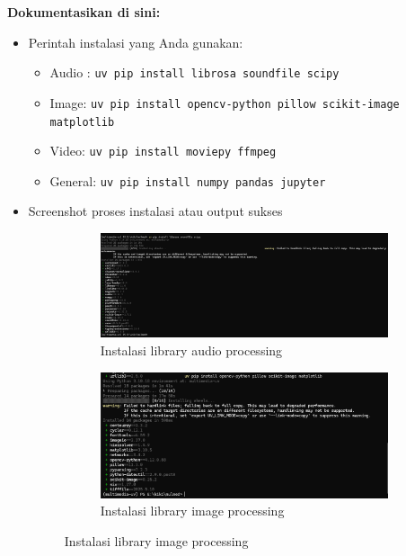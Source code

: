 \documentclass[11pt,a4paper]{article}
\begin{document}
\textbf{Dokumentasikan di sini:}
\begin{itemize}
    \item Perintah instalasi yang Anda gunakan:
        \begin{itemize}
            \item Audio : \texttt{uv pip install librosa soundfile scipy}
            \item Image: \texttt{uv pip install opencv-python pillow scikit-image matplotlib}
            \item Video: \texttt{uv pip install moviepy ffmpeg}
            \item General: \texttt{uv pip install numpy pandas jupyter}
        \end{itemize}
    \item Screenshot proses instalasi atau output sukses
        \begin{figure}[h]
            \centering
            \begin{subfigure}{0.48\textwidth}
                \includegraphics[width=\linewidth]{Figure/InstallAudio.png}
                \caption{Instalasi library audio processing}
            \end{subfigure}
            \begin{subfigure}{0.48\textwidth}
                \includegraphics[width=\linewidth]{Figure/InstallImage.png}
                \caption{Instalasi library image processing}
            \end{subfigure}

\end{figure}
\end{itemize}
\end{document}
